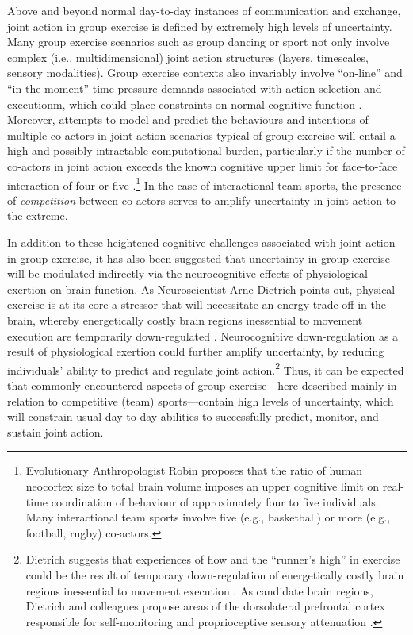 \begin{CJK}{UTF8}{gbsn}
Above and beyond normal day-to-day instances of communication and exchange, joint action in group exercise is defined by extremely high levels of uncertainty.  Many group exercise scenarios such as group dancing or sport not only involve complex (i.e., multidimensional) joint action structures (layers, timescales, sensory modalities).  Group exercise contexts also invariably involve ``on-line'' and ``in the moment'' time-pressure demands associated with action selection and executionm, which could place constraints on normal cognitive function \citep[as has been shown in laboratory studies of decision-making studies;][]{Kerstholt1994,Maule2000}.  Moreover, attempts to model and predict the behaviours and intentions of multiple co-actors in joint action scenarios typical of group exercise will entail a high and possibly intractable computational burden, particularly if the number of co-actors in joint action exceeds the known cognitive upper limit for face-to-face interaction of four or five \citep{Dunbar1992}.\footnote{Evolutionary Anthropologist Robin \textcite{Dunbar1992} proposes that the ratio of human neocortex size to total brain volume imposes an upper cognitive limit on real-time coordination of behaviour of approximately four to five individuals.  Many interactional team sports involve five (e.g., basketball) or more (e.g., football, rugby) co-actors.}  In the case of interactional team sports, the presence of \textit{competition} between co-actors \citep[whereby one individual or team of individuals actively attempts to foil or disrupt the actions of another individual or team of individuals;  see][]{Reimer2006} serves to amplify uncertainty in joint action to the extreme.

In addition to these heightened cognitive challenges associated with joint action in group exercise, it has also been suggested that uncertainty in group exercise will be modulated indirectly via the neurocognitive effects of physiological exertion on brain function.  As Neuroscientist Arne Dietrich points out, physical exercise is at its core a stressor that will necessitate an energy trade-off in the brain, whereby energetically costly brain regions inessential to movement execution are temporarily down-regulated \citep{Dietrich2004b}. Neurocognitive down-regulation as a result of physiological exertion could further amplify uncertainty, by reducing individuals' ability to predict and regulate joint action.\footnote{Dietrich suggests that experiences of flow and the ``runner's high'' in exercise could be the result of temporary down-regulation of energetically costly brain regions inessential to movement execution \citep{Dietrich2004b}.  As candidate brain regions, Dietrich and colleagues propose areas of the dorsolateral prefrontal cortex responsible for self-monitoring and proprioceptive sensory attenuation \citep[commonly known as the ``inner critic'' regions of the brain; see][]{Limb2008}.}  Thus, it can be expected that commonly encountered aspects of group exercise---here described mainly in relation to competitive (team) sports---contain high levels of uncertainty, which will constrain usual day-to-day abilities to successfully predict, monitor, and sustain joint action.


\end{CJK}
